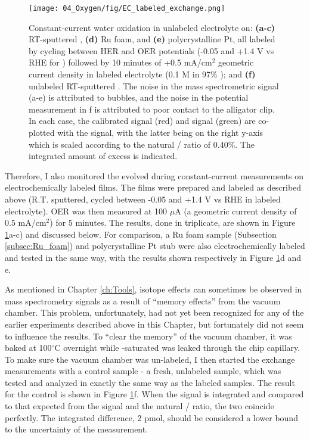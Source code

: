 \begin{figure}[h!]
	\centering
	\texttt{[image: 04\_Oxygen/fig/EC\_labeled\_exchange.png]}
	\caption{
		Constant-current water oxidation in unlabeled electrolyte on: \textbf{(a-c)} RT-sputtered , \textbf{(d)} Ru foam, and \textbf{(e)} polycrystalline Pt, all labeled by cycling between HER and OER potentials (-0.05 and +1.4 V vs RHE for ) followed by 10 minutes of +0.5 mA/cm$^2$ geometric current density in labeled electrolyte (0.1 M  in 97\% ); and \textbf{(f)} unlabeled RT-sputtered . The noise in the mass spectrometric signal (a-e) is attributed to bubbles, and the noise in the potential measurement in f is attributed to poor contact to the alligator clip. In each case, the calibrated  signal (red) and  signal (green) are co-plotted with the  signal, with the latter being on the right y-axis which is scaled according to the natural / ratio of 0.40\%. The integrated amount of excess  is indicated. 
	}
	\label{fig:EC_Ru}
\end{figure}

Therefore, I also monitored the  evolved during constant-current measurements on electrochemically labeled  films. The films were prepared and labeled as described above (R.T. sputtered, cycled between -0.05 and +1.4 V vs RHE in labeled electrolyte). OER was then measured at 100 $\mu$A (a geometric current density of 0.5 mA/cm$^2$) for 5 minutes. The results, done in triplicate, are shown in Figure \ref{fig:EC_Ru}a-c) and discussed below. For comparison, a Ru foam sample (Subsection \ref{subsec:Ru_foam}) and polycrystalline Pt stub were also electrochemically labeled and tested in the same way, with the results shown respectively in Figure \ref{fig:EC_Ru}d and e.

As mentioned in Chapter \ref{ch:Tools}, isotope effects can sometimes be observed in mass spectrometry signals as a result of ``memory effects'' from the vacuum chamber. This problem, unfortunately, had not yet been recognized for any of the earlier experiments described above in this Chapter, but fortunately did not seem to influence the results. To ``clear the memory'' of the vacuum chamber, it was baked at 100$^\circ$C overnight while -saturated  was leaked through the chip capillary. To make sure the vacuum chamber was un-labeled, I then started the exchange measurements with a control sample - a fresh, unlabeled  sample, which was tested and analyzed in exactly the same way as the labeled samples. The result for the control is shown in Figure \ref{fig:EC_Ru}f. When the  signal is integrated and compared to that expected from the  signal and the natural / ratio, the two coincide perfectly. The integrated difference, 2 pmol, should be considered a lower bound to the uncertainty of the measurement.


